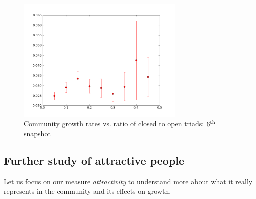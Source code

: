 \begin{figure}
  \begin{center}
    \includegraphics[width=8cm]{sixth.png}
    \caption{Community growth rates vs. ratio of closed to open triads: $6^{\rm th}$ snapshot}\label{fig:edge-f}
    \end{center}
\end{figure}



%
%
\subsection{Further study of attractive people}
Let us focus on our measure \emph{attractivity} to understand more about what it really represents in the community
and its effects on growth.

